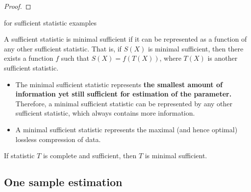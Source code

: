 \begin{refsection}
\begin{proof}
	
\end{proof}

\cite[451]{moon2000mathematical} for sufficient statistic examples







\begin{definition}\cite[48]{keener2010theoretical}
	A sufficient statistic is minimal sufficient if it can be represented as a function of any other sufficient statistic. That is, if $S(X)$ is minimal sufficient, then there exists a function $f$ such that $S(X) = f(T(X))$, where $T(X)$ is another sufficient statistic.
\end{definition}




\begin{remark}\hfill
	\begin{itemize}
		\item The minimal sufficient statistic represents \textbf{the smallest amount of information yet still sufficient for estimation of the parameter.} Therefore, a minimal sufficient statistic can be represented by any other sufficient statistic, which always contains more information.
		\item A minimal sufficient statistic represents the maximal (and hence optimal) lossless compression of data.
	\end{itemize}
\end{remark}

\begin{definition}\cite[48]{keener2010theoretical}
\end{definition}

\begin{theorem}\cite[49]{keener2010theoretical}
	If statistic $T$ is complete and sufficient, then $T$ is minimal sufficient. 
\end{theorem}

\subsection{One sample estimation}



\end{refsection}
